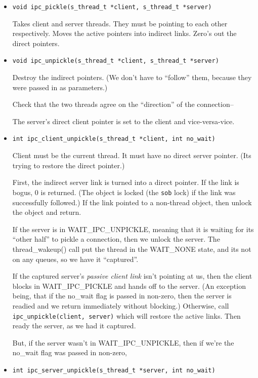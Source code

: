 \begin{itemize}

\item {\tt void ipc_pickle(s_thread_t *client, s_thread_t *server)}

Takes client and server threads.  They must be pointing to each other
respectively.  Moves the active pointers into indirect links.  Zero's
out the direct pointers.
 
\item {\tt void ipc_unpickle(s_thread_t *client, s_thread_t *server)}

Destroy the indirect pointers.  (We don't have to ``follow'' them,
because they were passed in as parameters.)

Check that the two threads agree on the ``direction'' of the
connection--



The server's direct client pointer is set to the client and
vice-versa-vice.

\item {\tt int ipc_client_unpickle(s_thread_t *client, int no_wait)}

Client must be the current thread.  It must have no direct server
pointer.  (Its trying to restore the direct pointer.)

First, the indirect server link is turned into a direct pointer. If
the link is bogus, 0 is returned.  (The object is locked (the {\tt sob}
lock) if the link was successfully followed.)  If the link pointed to a
non-thread object, then unlock the object and return.


If the server is in WAIT_IPC_UNPICKLE, meaning that it is waiting
for its ``other half'' to pickle a connection,  then we unlock the
server.  The thread_wakeup() call put the thread in the WAIT_NONE
state, and its not on any queues, so we have it ``captured''.

If the captured server's {\em passive client link} isn't pointing at
us, then the client blocks in WAIT_IPC_PICKLE and hands off to the
server.  (An exception being, that if the no_wait flag is passed in
non-zero, then the server is readied and we return immediately without
blocking.) Otherwise, call {\tt ipc_unpickle(client, server)} which
will restore the active links.  Then ready the server, as we had it
captured.

But, if the server wasn't in WAIT_IPC_UNPICKLE, then if we're the
no_wait flag was passed in non-zero, 

\item {\tt int ipc_server_unpickle(s_thread_t *server, int no_wait)}

\end{itemize}




